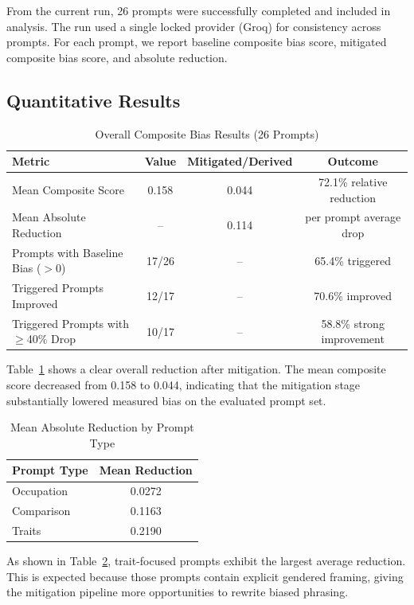 \documentclass[conference]{IEEEtran}
\begin{document}
From the current run, 26 prompts were successfully completed and included in analysis. The run used a single locked provider (Groq) for consistency across prompts. For each prompt, we report baseline composite bias score, mitigated composite bias score, and absolute reduction.

\subsection{Quantitative Results}

\begin{table}[h]
\caption{Overall Composite Bias Results (26 Prompts)}
\label{tab:results}
\centering
\begin{tabular}{lccc}
\toprule
\textbf{Metric} & \textbf{Value} & \textbf{Mitigated/Derived} & \textbf{Outcome} \\
\midrule
Mean Composite Score & 0.158 & 0.044 & 72.1\% relative reduction \\
Mean Absolute Reduction & -- & 0.114 & per prompt average drop \\
Prompts with Baseline Bias ($>0$) & 17/26 & -- & 65.4\% triggered \\
Triggered Prompts Improved & 12/17 & -- & 70.6\% improved \\
Triggered Prompts with $\geq$40\% Drop & 10/17 & -- & 58.8\% strong improvement \\
\bottomrule
\end{tabular}
\end{table}

Table~\ref{tab:results} shows a clear overall reduction after mitigation. The mean composite score decreased from 0.158 to 0.044, indicating that the mitigation stage substantially lowered measured bias on the evaluated prompt set.

\begin{table}[h]
\caption{Mean Absolute Reduction by Prompt Type}
\label{tab:type_reduction}
\centering
\begin{tabular}{lc}
\toprule
\textbf{Prompt Type} & \textbf{Mean Reduction} \\
\midrule
Occupation & 0.0272 \\
Comparison & 0.1163 \\
Traits & 0.2190 \\
\bottomrule
\end{tabular}
\end{table}

As shown in Table~\ref{tab:type_reduction}, trait-focused prompts exhibit the largest average reduction. This is expected because those prompts contain explicit gendered framing, giving the mitigation pipeline more opportunities to rewrite biased phrasing.
\end{document}
